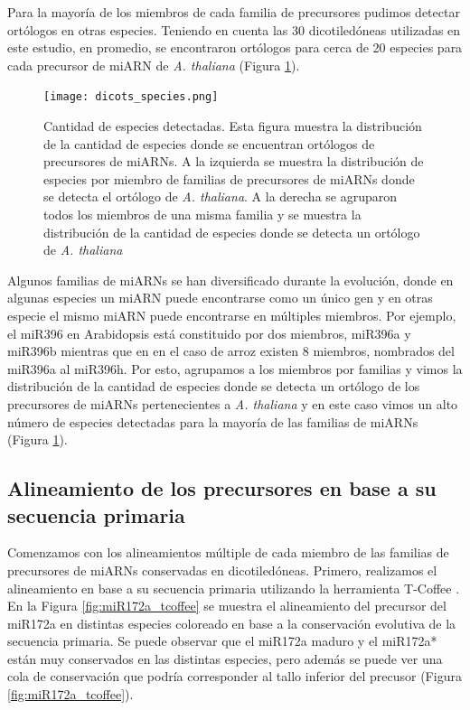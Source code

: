 Para la mayoría de los miembros de cada familia de precursores pudimos detectar ortólogos en otras especies. 
Teniendo en cuenta las 30 dicotiledóneas utilizadas en este estudio, en promedio, se encontraron ortólogos para cerca de 20 especies para cada precursor de miARN de \textit{A. thaliana} (Figura \ref{fig:dicots_species}).

\begin{figure}[htbp!] 
    \centering    
    \texttt{[image: dicots\_species.png]}
    \caption[Especies detectadas]{Cantidad de especies detectadas.
    Esta figura muestra la distribución de la cantidad de especies donde se encuentran ortólogos de precursores de miARNs.
    A la izquierda se muestra la distribución de especies por miembro de familias de precursores de miARNs donde se detecta el ortólogo de \textit{A. thaliana}.
    A la derecha se agruparon todos los miembros de una misma familia y se muestra la distribución de la cantidad de especies donde se detecta un ortólogo de \textit{A. thaliana}}
    \label{fig:dicots_species}
\end{figure}

Algunos familias de miARNs se han diversificado durante la evolución, donde en algunas especies un miARN puede encontrarse como un único gen y en otras especie el mismo miARN puede encontrarse en múltiples miembros.
Por ejemplo, el miR396 en Arabidopsis está constituido por dos miembros, miR396a y miR396b mientras que en en el caso de arroz existen 8 miembros, nombrados del miR396a al miR396h.
Por esto, agrupamos a los miembros por familias y vimos la distribución de la cantidad de especies donde se detecta un ortólogo de los precursores de miARNs pertenecientes a \textit{A. thaliana} y en este caso vimos un alto número de especies detectadas para la mayoría de las familias de miARNs (Figura \ref{fig:dicots_species}).

\subsection{Alineamiento de los precursores en base a su secuencia primaria}

Comenzamos con los alineamientos múltiple de cada miembro de las familias de precursores de miARNs conservadas en dicotiledóneas.
Primero, realizamos el alineamiento en base a su secuencia primaria utilizando la herramienta T-Coffee \citep{pmid10964570}.
En la Figura \ref{fig:miR172a_tcoffee} se muestra el alineamiento del precursor del miR172a en distintas especies coloreado en base a la conservación evolutiva de la secuencia primaria.
Se puede observar que el miR172a maduro y el miR172a* están muy conservados en las distintas especies, pero además se puede ver una cola de conservación que podría corresponder al tallo inferior del precusor (Figura \ref{fig:miR172a_tcoffee}).


